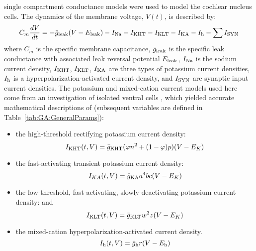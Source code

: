 \HH single compartment conductance models
\citep{HodgkinHuxley:1952a} were used to model the cochlear nucleus
cells. The dynamics of the membrane voltage, $V(t)$, is described by:
\begin{equation} \label{eq:GA:5} 
C_{m} \frac{dV}{dt} =-\bar{g}_{{\rm
      leak}} (V-E_{{\rm leak}} )-I_{{\rm Na}} -I_{{\rm KHT}} -I_{{\rm
      KLT}} -I_{{\rm KA}} -I_{{\rm h}} -\sum I_{{\rm SYN}}
\end{equation}
\noindent where $C_{m}$ is the specific membrane capacitance,
$\bar{g}_{{\rm leak}} $ is the specific leak conductance with
associated leak reversal potential $E_{{\rm leak}} $, $I_{{\rm Na}} $
is the sodium current density, $I_{{\rm KHT}} $, $I_{{\rm KLT}} $,
$I_{{\rm KA}} $ are three types of potassium current densities,
$I_{{\rm h}} $ is a hyperpolarization-activated current density, and
$I_{{\rm SYN}} $ are synaptic input current densities.  The potassium
and mixed-cation current models used here come from an investigation
of isolated ventral {\CN} cells
\citep{RothmanManis:2003,RothmanManis:2003a,RothmanManis:2003b}, which
yielded accurate mathematical descriptions of (subsequent variables
are defined in Table~\ref{tab:GA:GeneralParams}):
\begin{itemize}
\item the high-threshold rectifying potassium current density:
  \begin{equation} \label{eq:GA:6} 
I_{{\rm KHT}}(t,V)=\bar{g}_{{\rm KHT}} (\varphi n^{2} + (1-\varphi ) p)(V-E_{K} )
  \end{equation}
\item the fast-activating transient potassium current density:
  \begin{equation} \label{eq:GA:7} 
I_{KA} (t,V)=\bar{g}_{{\rm KA}} a^{4} b c (V-E_{K})
  \end{equation}
\item the low-threshold, fast-activating, slowly-deactivating
  potassium current density: and
  \begin{equation} \label{eq:GA:8} 
I_{{\rm KLT}}(t,V)=\bar{g}_{{\rm KLT}} w^{3} z (V-E_{K} )
  \end{equation}
\item the mixed-cation hyperpolarization-activated current density.
  \begin{equation} \label{eq:GA:9} 
I_{{\rm h}} (t,V)=\bar{g}_{{\rm h}} r (V-E_{{\rm h}} )
  \end{equation}
\end{itemize}

